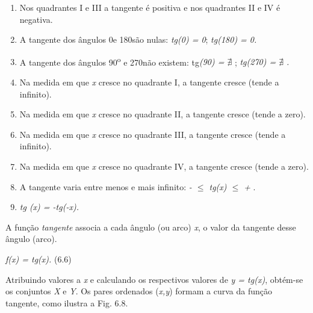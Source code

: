 \begin{caixa}
\begin{enumerate}
    \item Nos quadrantes I e III a tangente é positiva e nos quadrantes II e IV é negativa.

    \item A tangente dos ângulos 0\degree e 180\degree  são nulas:\textit{ tg(0\degree) = 0};  \textit{tg(180\degree) = 0.}

    \item A tangente dos ângulos 90\textsuperscript{o} e 270\degree não existem: tg\textit{(90\degree) =  \(  \nexists  \) };  \textit{tg(270\degree) =  \(  \nexists  \) .}

    \item Na medida em que \textit{x} cresce no quadrante I, a tangente cresce (tende a infinito).

    \item Na medida em que \textit{x} cresce no quadrante II, a tangente cresce (tende a zero).

    \item Na medida em que \textit{x} cresce no quadrante III, a tangente cresce (tende a infinito).

    \item Na medida em que \textit{x} cresce no quadrante IV, a tangente cresce (tende a zero).

    \item A tangente varia entre menos e mais infinito:   \textit{-  $ \leq $  tg(x) $ \leq $  + }.

    \item \textit{tg (x) = -tg(-x).}
\end{enumerate}
\end{caixa}

\begin{caixa}
A função \textit{tangente} associa a cada ângulo (ou arco) \textit{x}, o valor da tangente desse ângulo (arco).

\textit{f(x) = tg(x).} \tab (6.6)
\end{caixa}

Atribuindo valores a \textit{x} e calculando os respectivos valores de \textit{y = tg(x)}, obtém-se os conjuntos \textit{X }e\textit{ Y}. Os pares ordenados (\textit{x,y}) formam a curva da função tangente, como ilustra a Fig. 6.8.

